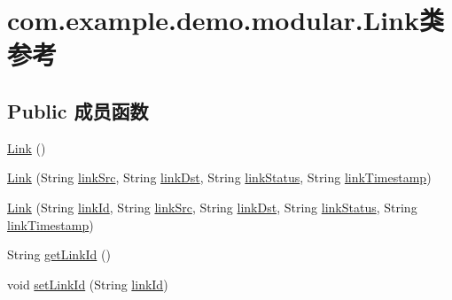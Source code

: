 \hypertarget{classcom_1_1example_1_1demo_1_1modular_1_1_link}{}\section{com.\+example.\+demo.\+modular.\+Link类 参考}
\label{classcom_1_1example_1_1demo_1_1modular_1_1_link}
\subsection*{Public 成员函数}
\begin{DoxyCompactItemize}
\item 
\mbox{\hyperlink{classcom_1_1example_1_1demo_1_1modular_1_1_link_a86f6c6071743a6a5b07a371c8adf995c}{Link}} ()
\item 
\mbox{\hyperlink{classcom_1_1example_1_1demo_1_1modular_1_1_link_ae59eaa8f7d02b11d540cef5ed0b26310}{Link}} (String \mbox{\hyperlink{classcom_1_1example_1_1demo_1_1modular_1_1_link_ac2d049679fb46a361629257f5733c3df}{link\+Src}}, String \mbox{\hyperlink{classcom_1_1example_1_1demo_1_1modular_1_1_link_af8571037fa483b1ecb926929e6006283}{link\+Dst}}, String \mbox{\hyperlink{classcom_1_1example_1_1demo_1_1modular_1_1_link_aefc889cc6b21a35d27cc1bc7152ee653}{link\+Status}}, String \mbox{\hyperlink{classcom_1_1example_1_1demo_1_1modular_1_1_link_a6639c75dac171ec78ee5966dcd64a232}{link\+Timestamp}})
\item 
\mbox{\hyperlink{classcom_1_1example_1_1demo_1_1modular_1_1_link_ad7497916c91e0de30e2c95c9af70e3a5}{Link}} (String \mbox{\hyperlink{classcom_1_1example_1_1demo_1_1modular_1_1_link_a7bb7ef4e4718a74b4bc8db673de38844}{link\+Id}}, String \mbox{\hyperlink{classcom_1_1example_1_1demo_1_1modular_1_1_link_ac2d049679fb46a361629257f5733c3df}{link\+Src}}, String \mbox{\hyperlink{classcom_1_1example_1_1demo_1_1modular_1_1_link_af8571037fa483b1ecb926929e6006283}{link\+Dst}}, String \mbox{\hyperlink{classcom_1_1example_1_1demo_1_1modular_1_1_link_aefc889cc6b21a35d27cc1bc7152ee653}{link\+Status}}, String \mbox{\hyperlink{classcom_1_1example_1_1demo_1_1modular_1_1_link_a6639c75dac171ec78ee5966dcd64a232}{link\+Timestamp}})
\item 
String \mbox{\hyperlink{classcom_1_1example_1_1demo_1_1modular_1_1_link_a845e46dc06d0f043aaba149ac6680f11}{get\+Link\+Id}} ()
\item 
void \mbox{\hyperlink{classcom_1_1example_1_1demo_1_1modular_1_1_link_a415c4da09f57358d8d14e296c02d58eb}{set\+Link\+Id}} (String \mbox{\hyperlink{classcom_1_1example_1_1demo_1_1modular_1_1_link_a7bb7ef4e4718a74b4bc8db673de38844}{link\+Id}})

\end{DoxyCompactItemize}
